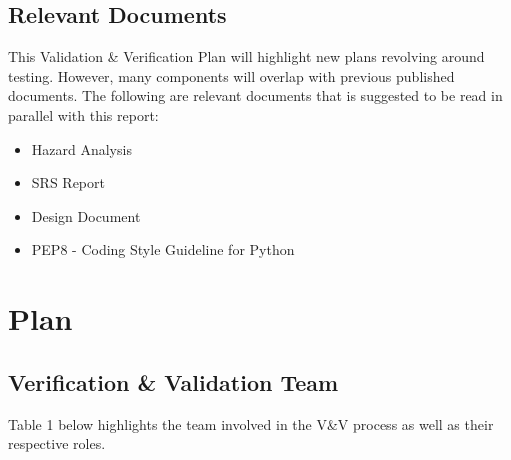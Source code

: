 \documentclass[12pt, titlepage]{article}
\begin{document}
\subsection{Relevant Documents}
This Validation \& Verification Plan will highlight new plans revolving around testing. However, many components will overlap with previous published documents. The following are relevant documents that is suggested to be read in parallel with this report:
\begin{itemize}
    \item Hazard Analysis
    \item SRS Report
    \item Design Document
    \item PEP8 - Coding Style Guideline for Python
\end{itemize}


\section{Plan}

\subsection{Verification \& Validation Team}
Table 1 below highlights the team involved in the V\&V process as well as their respective roles.
\end{document}
